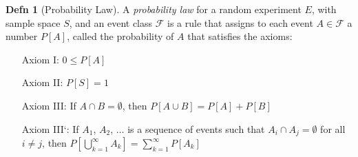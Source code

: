 \documentclass[10pt,letterpaper,final,twoside,notitlepage]{article}
\theoremstyle{plain}
\theoremstyle{definition}
\newtheorem{definition}{Defn}
\begin{document}
	\begin{definition}[Probability Law] \label{def:Probability Law}
		A \emph{probability law} for a random experiment $E$, with sample space $S$, and an event class $\mathcal{F}$ is a rule that assigns to each event $A \in \mathcal{F}$ a number $P \left[A \right]$, called the probability of $A$ that satisfies the axioms:
		\begin{itemize}[align=left, noitemsep, nolistsep] \label{subdef:Probability Law Axioms}
			\item[Axiom I:] $0 \leq P\left[ A \right]$
			\item[Axiom II:] $P \left[ S \right] = 1$
			\item[Axiom III:] If $A \cap B = \emptyset$, then $P \left[ A \cup B \right] = P \left[ A \right] + P \left[ B \right]$
			\item[Axiom III`:] If $A_{1}$, $A_{2}$, $\ldots$ is a sequence of events such that $A_{i} \cap A_{j} = \emptyset$ for all $i \neq j$, then $P \left[ \bigcup_{k=1}^{\infty} A_{k} \right] = \sum_{k=1}^{\infty} P \left[ A_{k} \right]$
		\end{itemize}
	\end{definition}
	
\end{document}
